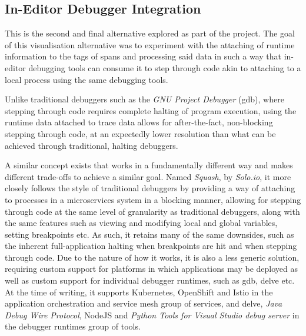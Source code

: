 \documentclass[12pt,pdftex,titlepage]{report}
\begin{document}
            \subsection{In-Editor Debugger Integration}
            \label{sec:debugger}
                This is the second and final alternative explored as part of the project. The goal of this visualisation alternative was to
                experiment with the attaching of runtime information to the tags of spans and processing said data in such a way that in-editor
                debugging tools can consume it to step through code akin to attaching to a local process using the same debugging tools.
        
                Unlike traditional debuggers such as the \textit{GNU Project Debugger} (gdb)\cite{gdb}, where stepping through code requires complete
                halting of program execution, using the runtime data attached to trace data allows for after-the-fact, non-blocking stepping
                through code, at an expectedly lower resolution than what can be achieved through traditional, halting debuggers.
        
                A similar concept exists that works in a fundamentally different way and makes different trade-offs to achieve a similar goal.
                Named \textit{Squash}, by \textit{Solo.io}, it more closely follows the style of traditional debuggers by providing a way of attaching
                to processes in a microservices system in a blocking manner, allowing for stepping through code at the same level of granularity as 
                traditional debuggers, along with the same features such as viewing and modifying local and global variables, setting breakpoints etc.
                As such, it retains many of the same downsides, such as the inherent full-application halting when breakpoints are hit and when stepping
                through code. Due to the nature of how it works, it is also a less generic solution, requiring custom support for platforms in which applications
                may be deployed as well as custom support for individual debugger runtimes, such as gdb, delve\cite{delve} etc. At the time of writing, it supports Kubernetes, 
                OpenShift and Istio in the application orchestration and service mesh group of services, and delve, \textit{Java Debug Wire Protocol}\cite{jdwp}, 
                NodeJS\cite{nodejs} and \textit{Python Tools for Visual Studio debug server}\cite{ptvsd} in the debugger runtimes group of tools.
\end{document}
